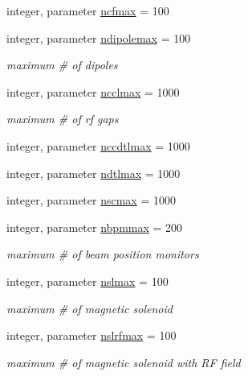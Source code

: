 \begin{DoxyCompactItemize}
integer, parameter \mbox{\hyperlink{namespacenumconstclass_a94e49bcdcfdd3ed05de0d41af396f4d1}{ncfmax}} = 100
\item 
integer, parameter \mbox{\hyperlink{namespacenumconstclass_a35f5d91828a6dc16c619583554a1566d}{ndipolemax}} = 100
\begin{DoxyCompactList}\small\item\em maximum \# of dipoles \end{DoxyCompactList}\item 
integer, parameter \mbox{\hyperlink{namespacenumconstclass_ad4189a0ff5d1f4848364ea3012cddfd0}{ncclmax}} = 1000
\begin{DoxyCompactList}\small\item\em maximum \# of rf gaps \end{DoxyCompactList}\item 
integer, parameter \mbox{\hyperlink{namespacenumconstclass_a27ee6b57f509d99358609230f3ea289a}{nccdtlmax}} = 1000
\item 
integer, parameter \mbox{\hyperlink{namespacenumconstclass_a36b8673b359ee1e52cd37349ec8e51ad}{ndtlmax}} = 1000
\item 
integer, parameter \mbox{\hyperlink{namespacenumconstclass_a842fc257d326a7d9ec49e681832e6aa3}{nscmax}} = 1000
\item 
integer, parameter \mbox{\hyperlink{namespacenumconstclass_a2a11d40986bf0aa3873c57eccd9cdfac}{nbpmmax}} = 200
\begin{DoxyCompactList}\small\item\em maximum \# of beam position monitors \end{DoxyCompactList}\item 
integer, parameter \mbox{\hyperlink{namespacenumconstclass_a538bae3eec1dd1a5815019847df66e23}{nslmax}} = 100
\begin{DoxyCompactList}\small\item\em maximum \# of magnetic solenoid \end{DoxyCompactList}\item 
integer, parameter \mbox{\hyperlink{namespacenumconstclass_a454ee9bf5d3755b8cfc222eedcb9495d}{nslrfmax}} = 100
\begin{DoxyCompactList}\small\item\em maximum \# of magnetic solenoid with RF field \end{DoxyCompactList}\end{DoxyCompactItemize}
\textbf{ }\par
